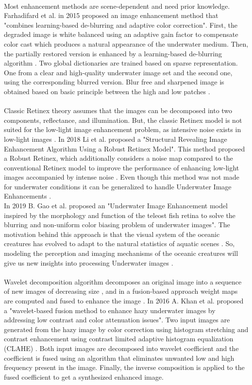 \documentclass[a4paper,11pt,oneside]{article}
\begin{document}
  \\
  Most enhancement methods are scene-dependent and need prior knowledge. Farhadifard et al. \cite{14} in 2015 proposed an image enhancement method that "combines learning-based de-blurring and adaptive color correction". First, the degraded image is white balanced using an adaptive gain factor to compensate color cast which produces a natural appearance of the underwater medium. Then, the partially restored version is enhanced by a learning-based de-blurring algorithm \cite{14}. Two global dictionaries are trained based on sparse representation. One from a clear and high-quality underwater image set and the second one, using the corresponding blurred version. Blur free and sharpened image is obtained based on basic principle between the high and low patches \cite{14}.\\
  \\
    Classic Retinex theory assumes that the images can be decomposed into two components, reflectance, and illumination. But, the classic Retinex model is not suited for the low-light image enhancement problem, as intensive noise exists in low-light images \cite{5}. In 2018 Li et al. \cite{5} proposed a "Structural Revealing Image Enhancement Algorithm Using a Robust Retinex Model". This method proposed a Robust Retinex, which additionally considers a noise map compared to the conventional Retinex model to improve the performance of enhancing low-light images accompanied by intense noise \cite{5}. Even though this method was not made for underwater conditions it can be generalized to handle Underwater Image Enhancements \cite{5}.\\
  In 2019 B. Gao et al. \cite{6} proposed an "Underwater Image Enhancement model inspired by the morphology and function of the teleost fish retina to solve the blurring and non-uniform color biasing problem of underwater images". The motivation behind this approach is that the visual system of the oceanic creatures has evolved to adapt to the natural statistics of aquatic scenes \cite{6}. So, modeling the perception and imaging mechanisms of the oceanic creatures will give us new insights into processing Underwater images \cite{6}.\\
  \\
   Wavelet decomposition algorithm decomposes an original image into a sequence of new images of decreasing size \cite{24}, and in a fusion-based approach weight maps are computed and fused to enhance the image \cite{10}.  In 2016 A. Khan et al. \cite{9} proposed a "wavelet-based fusion method to enhance hazy underwater images by addressing low contrast and color attenuation issues". Two input images are generated from the hazy image by color correction using histogram stretching and contrast enhancement using contrast limited adaptive histogram equalization (CLAHE) \cite{9}. Both input images are decomposed into wavelet coefficient and the coefficient is fused using an algorithm that eliminates unwanted low and high frequency present in the image. Finally, the inverse composition is applied to the fused coefficient to get a synthesized enhanced image. \cite{9}\\
\end{document}
